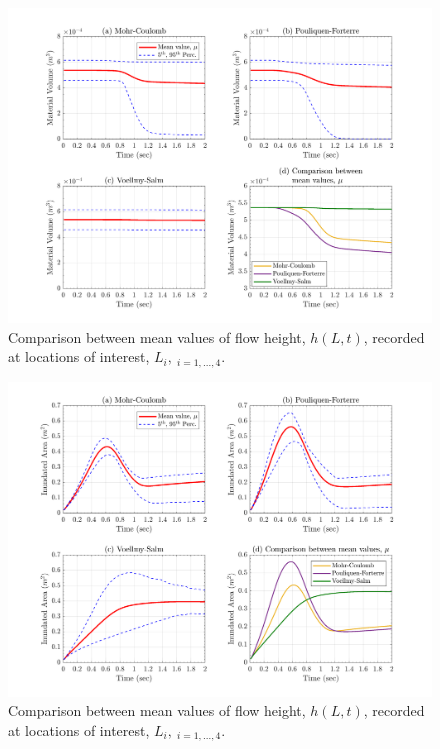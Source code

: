 \documentclass{article}
\begin{document}
\begin{figure}[H]
        \centering
        \includegraphics[width=1\textwidth]{InclinedPlane/Height/Volume_SpatialRec.png}
        \caption{Comparison between mean values of flow height, $h(L,t)$, recorded at locations of interest, $L_i, \ _{i=1,...,4}$.}
        \label{fig:Ramp-Volume-spatial}
\end{figure}

\begin{figure}[H]
        \centering
        \includegraphics[width=1\textwidth]{InclinedPlane/Height/Area_SpatialRec.png}
        \caption{Comparison between mean values of flow height, $h(L,t)$, recorded at locations of interest, $L_i, \ _{i=1,...,4}$.}
        \label{fig:Ramp-InundArea-spatial}
\end{figure}
\end{document}
